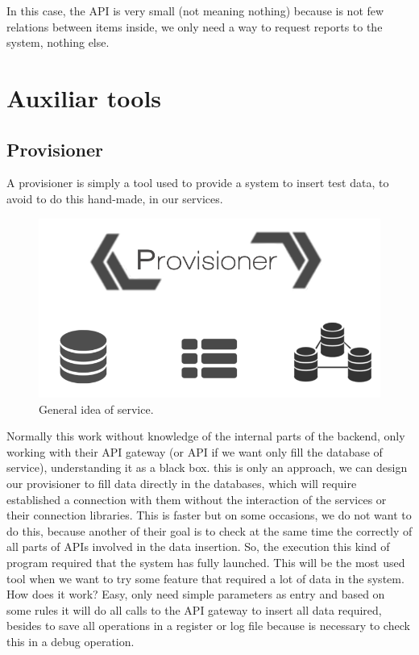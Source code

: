 In this case, the API is very small (not meaning nothing) because is not few
relations between items inside, we only need a way to request reports to the
system, nothing else.

\section{Auxiliar tools}

\subsection{Provisioner}
A provisioner is simply a tool used to provide a system to insert test data, to
avoid to do this hand-made, in our services.

\begin{figure}[H]
  \includegraphics[scale=0.4]{img/graphics/provisioner.png}
  \centering
  \caption{General idea of service.}
\end{figure}

\noindent Normally this work without knowledge
of the internal parts of the backend, only working with their API gateway (or
API if we want only fill the database of service), understanding it as a black box.
this is only an approach, we can design our provisioner to fill data directly
in the databases, which will require established a connection with them without
the interaction of the services or their connection libraries. This is faster but
on some occasions, we do not want to do this, because another of their goal is to
check at the same time the correctly of all parts of APIs involved in the data insertion.
\intro
So, the execution this kind of program required that the system has fully launched.
This will be the most used tool when we want to try some feature that required a
lot of data in the system.
\intro
How does it work? Easy, only need simple parameters as entry and based on some rules it will do all
calls to the API gateway to insert all data required, besides to save all operations
in a register or log file because is necessary to check this in a debug operation.

